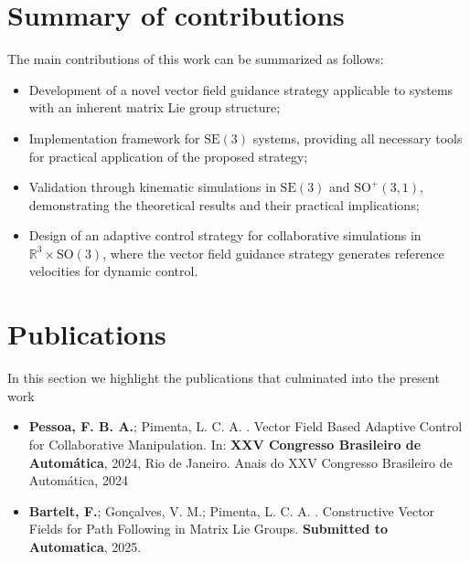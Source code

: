 \section{Summary of contributions}
The main contributions of this work can be summarized as follows:
\begin{itemize}
    \item Development of a novel vector field guidance strategy applicable to systems with an inherent matrix Lie group structure;
    \item Implementation framework for $\text{SE}(3)$ systems, providing all necessary tools for practical application of the proposed strategy;
    \item Validation through kinematic simulations in $\text{SE}(3)$ and $\text{SO}^+(3,1)$, demonstrating the theoretical results and their practical implications;
    \item Design of an adaptive control strategy for collaborative simulations in $\mathbb{R}^3 \times \text{SO}(3)$, where the vector field guidance strategy generates reference velocities for dynamic control.
\end{itemize}

\section{Publications}
In this section we highlight the publications that culminated into the present work
\begin{itemize}
    \item \textbf{Pessoa, F. B. A.}; Pimenta, L. C. A. . Vector Field Based Adaptive Control for Collaborative Manipulation. In: \textbf{XXV Congresso Brasileiro de Automática}, 2024, Rio de Janeiro. Anais do XXV Congresso Brasileiro de Automática, 2024
    \item \textbf{Bartelt, F.}; Gonçalves, V. M.; Pimenta, L. C. A. . Constructive Vector Fields for Path Following in Matrix Lie Groups. \textbf{Submitted to Automatica}, 2025.
\end{itemize}
